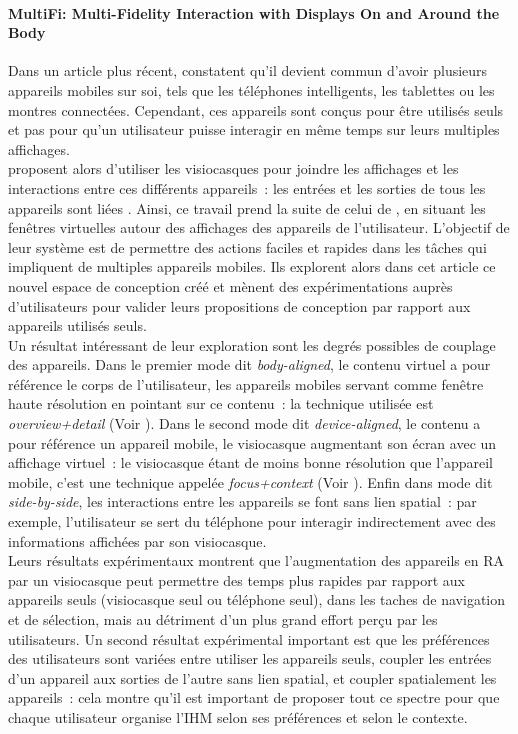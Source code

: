 \paragraph*{\foreignlanguage{english}{MultiFi: Multi-Fidelity Interaction with Displays On and Around the Body}}
Dans un article plus récent, \cite{GrubertKranzQuigley2015} constatent qu'il devient commun d'avoir plusieurs appareils mobiles sur soi, tels que les téléphones intelligents, les tablettes ou les montres connectées. Cependant, ces appareils sont conçus pour être utilisés seuls et pas pour qu'un utilisateur puisse interagir en même temps sur leurs multiples affichages.\\
\citeauthor{GrubertKranzQuigley2015} proposent alors d'utiliser les visiocasques pour joindre les affichages et les interactions entre ces différents appareils~: les entrées et les sorties de tous les appareils sont liées . Ainsi, ce travail prend la suite de celui de \citet{EnsFinneganIrani2014}, en situant les fenêtres virtuelles autour des affichages des appareils de l'utilisateur. L'objectif de leur système est de permettre des actions faciles et rapides dans les tâches qui impliquent de multiples appareils mobiles. Ils explorent alors dans cet article ce nouvel espace de conception créé et mènent des expérimentations auprès d'utilisateurs pour valider leurs propositions de conception par rapport aux appareils utilisés seuls.\\
Un résultat intéressant de leur exploration sont les degrés possibles de couplage des appareils. Dans le premier mode dit \emph{body-aligned}, le contenu virtuel a pour référence le corps de l'utilisateur, les appareils mobiles servant comme fenêtre haute résolution en pointant sur ce contenu~: la technique utilisée est \emph{overview+detail} (Voir \citep{BergeSerranoPerelmanEtAl2014}). Dans le second mode dit \emph{device-aligned}, le contenu a pour référence un appareil mobile, le visiocasque augmentant son écran avec un affichage virtuel~: le visiocasque étant de moins bonne résolution que l'appareil mobile, c'est une technique appelée \emph{focus+context} (Voir \cite{BaudischGoodStewart2001}). Enfin dans mode dit \emph{side-by-side}, les interactions entre les appareils se font sans lien spatial~: par exemple, l'utilisateur se sert du téléphone pour interagir indirectement avec des informations affichées par son visiocasque.\\
Leurs résultats expérimentaux montrent que l'augmentation des appareils en RA par un visiocasque peut permettre des temps plus rapides par rapport aux appareils seuls (visiocasque seul ou téléphone seul), dans les taches de navigation et de sélection, mais au détriment d'un plus grand effort perçu par les utilisateurs. Un second résultat expérimental important est que les préférences des utilisateurs sont variées entre utiliser les appareils seuls, coupler les entrées d'un appareil aux sorties de l'autre sans lien spatial, et coupler spatialement les appareils~: cela montre qu'il est important de proposer tout ce spectre pour que chaque utilisateur organise l'IHM selon ses préférences et selon le contexte.\\

